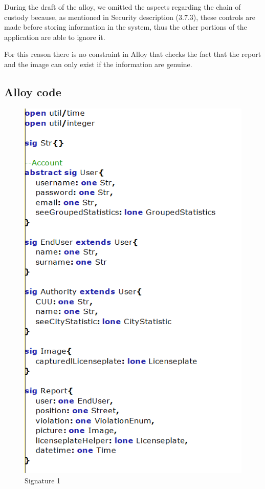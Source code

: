 During the draft of the alloy, we omitted the aspects regarding the chain of custody because, as mentioned in Security description (3.7.3), these controls are made before storing information in the system, thus the other portions of the application are able to ignore it.

For this reason there is no constraint in Alloy that checks the fact that the report and the image can only exist if the information are genuine.
\newpage

\subsection{Alloy code}
\begin{figure}[!htbp]
	\centering
	\includegraphics[width=0.9\linewidth, height=0.8 \textheight]{Images/Alloy/codealloy1}
	\caption{Signature 1}
	\label{Signature 1}
\end{figure}

